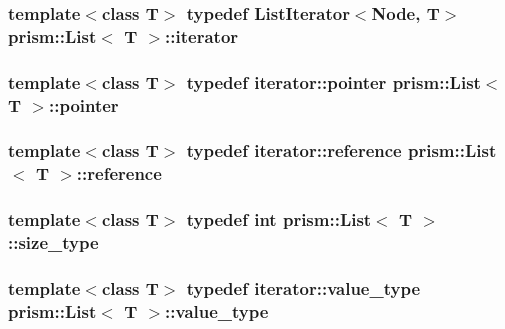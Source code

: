 \subsubsection[{\texorpdfstring{iterator}{iterator}}]{\setlength{\rightskip}{0pt plus 5cm}template$<$class T$>$ typedef {\bf List\+Iterator}$<$Node, T$>$ {\bf prism\+::\+List}$<$ T $>$\+::{\bf iterator}}\hypertarget{classprism_1_1_list_a6cf00c98a428ed325fe9ccc60d7ef95a}{}\label{classprism_1_1_list_a6cf00c98a428ed325fe9ccc60d7ef95a}
\subsubsection[{\texorpdfstring{pointer}{pointer}}]{\setlength{\rightskip}{0pt plus 5cm}template$<$class T$>$ typedef {\bf iterator\+::pointer} {\bf prism\+::\+List}$<$ T $>$\+::{\bf pointer}}\hypertarget{classprism_1_1_list_aed257df5c1db1015841de21318b6c5c2}{}\label{classprism_1_1_list_aed257df5c1db1015841de21318b6c5c2}
\subsubsection[{\texorpdfstring{reference}{reference}}]{\setlength{\rightskip}{0pt plus 5cm}template$<$class T$>$ typedef {\bf iterator\+::reference} {\bf prism\+::\+List}$<$ T $>$\+::{\bf reference}}\hypertarget{classprism_1_1_list_aace7abca3cacb471bba9f04bba680fc3}{}\label{classprism_1_1_list_aace7abca3cacb471bba9f04bba680fc3}
\subsubsection[{\texorpdfstring{size\+\_\+type}{size_type}}]{\setlength{\rightskip}{0pt plus 5cm}template$<$class T$>$ typedef int {\bf prism\+::\+List}$<$ T $>$\+::{\bf size\+\_\+type}}\hypertarget{classprism_1_1_list_a1d3fe26a6fe0ec8f6a63e70bb59979bd}{}\label{classprism_1_1_list_a1d3fe26a6fe0ec8f6a63e70bb59979bd}
\subsubsection[{\texorpdfstring{value\+\_\+type}{value_type}}]{\setlength{\rightskip}{0pt plus 5cm}template$<$class T$>$ typedef {\bf iterator\+::value\+\_\+type} {\bf prism\+::\+List}$<$ T $>$\+::{\bf value\+\_\+type}}\hypertarget{classprism_1_1_list_a7f20672ea7b8f748420548308e07dbc1}{}\label{classprism_1_1_list_a7f20672ea7b8f748420548308e07dbc1}


